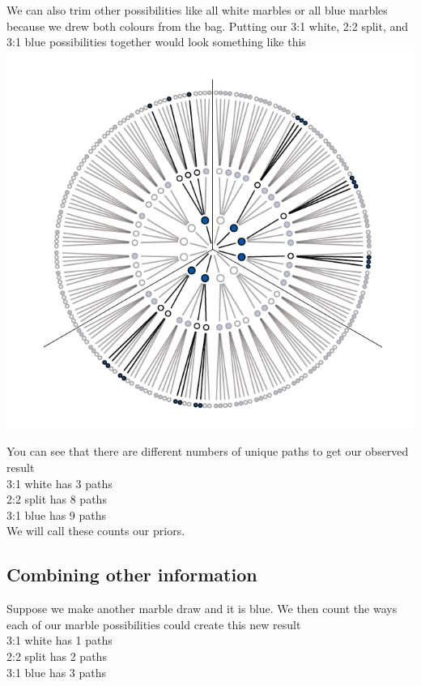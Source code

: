 \documentclass[
]{book}
\theoremstyle{definition}
\theoremstyle{definition}
\theoremstyle{definition}
\theoremstyle{definition}
\theoremstyle{remark}
\begin{document}
We can also trim other possibilities like all white marbles or all blue marbles because we drew both colours from the bag. Putting our 3:1 white, 2:2 split, and 3:1 blue possibilities together would look something like this\\

\includegraphics[width=9.28in]{./_images/fig2.5}

You can see that there are different numbers of unique paths to get our observed result\\
3:1 white has 3 paths\\
2:2 split has 8 paths\\
3:1 blue has 9 paths\\

We will call these counts our priors.

\hypertarget{combining-other-information}{%
\subsection{Combining other information}\label{combining-other-information}}

Suppose we make another marble draw and it is blue. We then count the ways each of our marble possibilities could create this new result\\

3:1 white has 1 paths\\
2:2 split has 2 paths\\
3:1 blue has 3 paths\\
\end{document}

